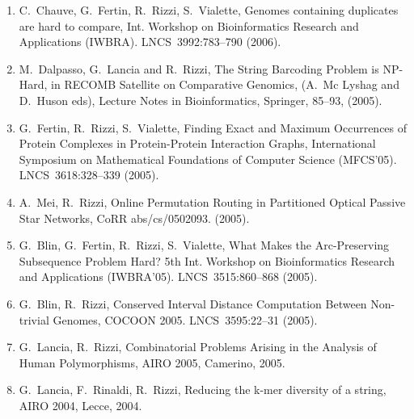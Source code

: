\documentclass[11pt]{article}
\begin{document}
\begin{enumerate}
\vspace{-1.8mm}
  \item {C.~Chauve, G.~Fertin, R.~Rizzi, S.~Vialette},
   \newblock Genomes containing duplicates are hard to compare,
   \newblock Int. Workshop on Bioinformatics Research and Applications (IWBRA).
   \newblock LNCS~3992:783--790 (2006).

\vspace{-1.8mm}
  \item {M.~Dalpasso, G.~Lancia and R.~Rizzi},
   \newblock The String Barcoding Problem is NP-Hard,
   \newblock in RECOMB Satellite on Comparative Genomics, (A.~Mc Lyshag and D.~Huson eds),
   \newblock Lecture Notes in Bioinformatics, Springer, 85--93, (2005). 

\vspace{-1.8mm}
  \item {G.~Fertin, R.~Rizzi, S.~Vialette},
   \newblock Finding Exact and Maximum Occurrences
of Protein Complexes in Protein-Protein Interaction Graphs,
   \newblock International Symposium on Mathematical Foundations of Computer Science (MFCS'05).
   \newblock LNCS~3618:328--339 (2005).

\vspace{-1.8mm}
  \item {A.~Mei, R.~Rizzi},
   \newblock Online Permutation Routing in Partitioned Optical Passive Star Networks,
   \newblock CoRR abs/cs/0502093. (2005).

\vspace{-1.8mm}
  \item {G.~Blin, G.~Fertin, R.~Rizzi, S.~Vialette},
   \newblock What Makes the Arc-Preserving Subsequence Problem Hard?
   \newblock 5th Int. Workshop on Bioinformatics Research and Applications (IWBRA'05).
   \newblock  LNCS~3515:860--868 (2005).

\vspace{-1.8mm}
  \item {G.~Blin, R.~Rizzi},
   \newblock Conserved Interval Distance Computation Between Non-trivial Genomes,
   \newblock COCOON 2005.
   \newblock  LNCS~3595:22--31 (2005).

\vspace{-1.8mm}
  \item {G.~Lancia, R.~Rizzi},
   \newblock Combinatorial Problems Arising in the Analysis of Human Polymorphisms,
   \newblock AIRO 2005, Camerino, 2005.

\vspace{-1.8mm}
  \item {G.~Lancia, F.~Rinaldi, R.~Rizzi},
   \newblock Reducing the k-mer diversity of a string,
   \newblock AIRO 2004, Lecce, 2004.


\end{enumerate}
\end{document}

